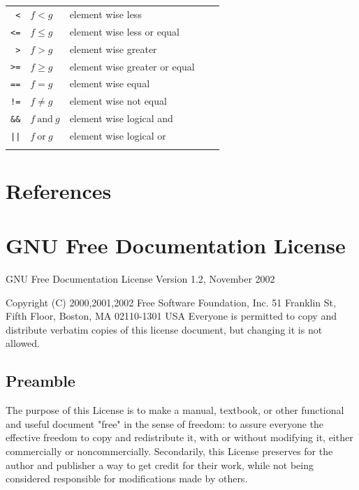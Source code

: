 \documentclass[11pt]{article}
\begin{document}
\begin{longtable}[c]{rllll}
  \lstinline!<! & $f < g$ & element wise less  & & \\
  \lstinline!<=! & $f \leq g$ & element wise less or equal  & & \\
  \lstinline!>! & $f > g$ & element wise greater  & & \\
  \lstinline!>=! & $f \geq g$ & element wise greater or equal  & & \\
  \lstinline!==! & $f = g$ & element wise  equal  & & \\
  \lstinline+!=+ & $f \neq g$ & element wise not equal  & & \\
  \lstinline!&&! & $f\ \text{and}\ g$ & element wise logical and  & & \\
  \lstinline!||! & $f\ \text{or}\ g$ & element wise logical or  & & \\\hline\\


\end{longtable}

\newpage

\section{References}
\label{sec:references}

\renewcommand{\bibname}{}
\renewcommand{\refname}{}
\nocite{*}



\newpage
\section{GNU Free Documentation License}
\label{sec:gnu-free-docum}

		GNU Free Documentation License
		  Version 1.2, November 2002


 Copyright (C) 2000,2001,2002  Free Software Foundation, Inc.
     51 Franklin St, Fifth Floor, Boston, MA  02110-1301  USA
 Everyone is permitted to copy and distribute verbatim copies
 of this license document, but changing it is not allowed.


\subsection*{Preamble}

The purpose of this License is to make a manual, textbook, or other
functional and useful document "free" in the sense of freedom: to
assure everyone the effective freedom to copy and redistribute it,
with or without modifying it, either commercially or noncommercially.
Secondarily, this License preserves for the author and publisher a way
to get credit for their work, while not being considered responsible
for modifications made by others.
\end{document}
